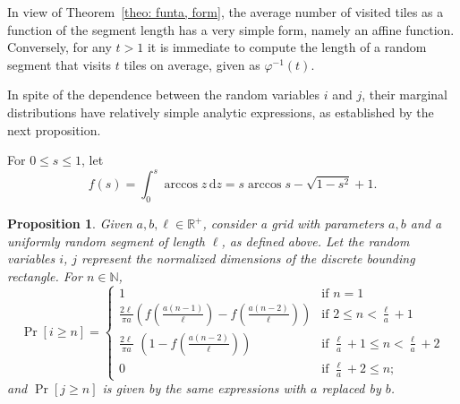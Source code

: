 \documentclass[12pt, a4paper]{article}
\newcommand{\diff}{\mathrm d}
\newcommand{\funta}{\varphi} %
\newcommand{\len}{\ell} %
\newcommand{\tiles}{t} %
\newcommand{\genvar}{s}
\newtheorem{proposition}{Proposition}%
\begin{document}
In view of Theorem~\ref{theo: funta, form}, the average number of visited tiles as a function of the segment length has a very simple form, namely an affine function. Conversely, for any $\tiles>1$ it is immediate to compute the length of a random segment that visits $\tiles$ tiles on average, given as $\funta^{-1}(\tiles)$.

In spite of the dependence between the random variables $i$ and $j$, their marginal distributions have relatively simple analytic expressions, as established by the next proposition.

For $0 \leq \genvar \leq 1$, let
\begin{equation}
\label{eq: f}
f(\genvar) = \int_0^\genvar \arccos z \, \diff z = \genvar \arccos \genvar - \sqrt{1-\genvar^2} + 1.
\end{equation}

\begin{proposition}
\label{prop: Pr i}
Given $a, b, \len \in \mathbb R^+$, consider a grid with parameters $a, b$ and a uniformly random segment of length $\len$, as defined above. Let the random variables $i$, $j$ represent the normalized dimensions of the discrete bounding rectangle. For $n \in \mathbb N$,
\begin{equation}
\label{eq: Pr i geq n}
\Pr[i \geq n] = \begin{cases}
\displaystyle
1 &\text{if\ \ } \displaystyle n =1 \\[1 mm] %
\displaystyle
\frac{2\len}{\pi a} \left(f\left(\frac{a(n-1)}{\len}\right)-f\left(\frac{a(n-2)}{\len} \right)\right) &\text{if\ \ } \displaystyle 2 \leq n < \frac \len a + 1 \\[4 mm] %
\displaystyle
\frac{2\len}{\pi a}\,\, \left(1 - f\left(\frac{a(n-2)}{\len}\right)\right) &\text{if\ \ } \displaystyle \frac\len a + 1 \leq n < \frac\len a+2 \\[3 mm] %
\displaystyle
0 &\text{if\ \ } \displaystyle \frac \len a + 2 \leq  n;
\end{cases}
\end{equation}
and $\Pr[j \geq n]$ is given by the same expressions with $a$ replaced by $b$.
\end{proposition}
\end{document}
